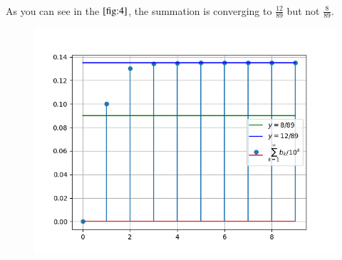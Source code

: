 \documentclass[journal,12pt,twocolumn]{IEEEtran}
\renewcommand\thesection{\arabic{section}}
\begin{document}
\begin{enumerate}[label=\thesection.\arabic*
,ref=\thesection.\theenumi]
\begin{align}
\end{align}
\solution As you can see in the $\ref{fig:4}$, the summation is converging to $\frac{12}{89}$ but not $\frac{8}{89}$.
\begin{figure}[!ht]
 \includegraphics[width = \columnwidth]{Figs/1.4.png}
 \centering
 \caption{}
 \label{fig:4}
\end{figure}
\end{enumerate}
\end{document}
